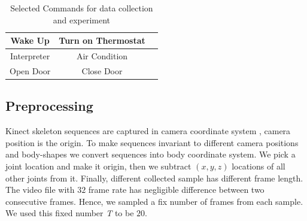 \documentclass[10pt,twocolumn,letterpaper]{article}
\begin{document}
\begin{table}[h]
	\begin{center}
		\begin{tabular}{|c|c|c}
			\hline
			Wake Up & Turn on Thermostat\\
			\hline
			Interpreter & Air Condition\\
			\hline
			Open Door & Close Door\\
			\hline
		\end{tabular}
	\end{center}
	\caption{Selected Commands for data collection and experiment}
	\label{table:asl_signs}
\end{table}

\subsection{Preprocessing}
Kinect skeleton sequences are captured in camera coordinate system \ie, camera position is the origin. To make sequences invariant to different camera positions and body-shapes we convert sequences into body coordinate system. We pick a joint location and make it origin, then we subtract $(x, y, z)$ locations of all other joints from it. Finally, different collected sample has different frame length. The video file with $32$ frame rate has negligible difference between two consecutive frames. Hence, we sampled a fix number of frames from each sample. We used this fixed number \textit{T} to be $20$. 
\end{document}
